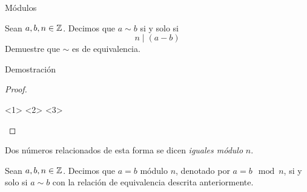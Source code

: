 \begin{frame}{Módulos}
	\begin{exercise}
		Sean $ a, b, n\in\mathbb{Z}^{} $. Decimos que $ a\sim b $ si y solo si
		\[ n\mid(a - b) \]
		Demuestre que $ \sim $ es de equivalencia.
	\end{exercise}
\end{frame}
\begin{frame}{Demostración}
	\begin{proof}
		\begin{itemize}
			<1>
			<2>
			<3>
		\end{itemize}
	\end{proof}
\end{frame}
\begin{frame}
	Dos números relacionados de esta forma se dicen \emph{iguales módulo} $ n $.
	\begin{mdefinition}[Módulo]
		Sean $ a, b, n\in\mathbb{Z}^{} $. Decimos que $ a = b $ módulo $ n $, denotado por $ a = b\mod n $, si y solo si $ a\sim b $ con la relación de equivalencia descrita anteriormente.
	\end{mdefinition}
\end{frame}